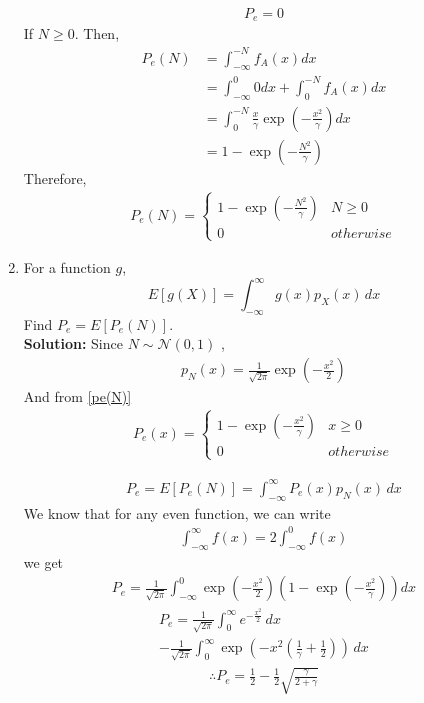 \documentclass[journal,10pt,twocolumn]{IEEEtran}
\newcounter{Chapcounter}
\numberwithin{equation}{subsection}
\numberwithin{figure}{subsection}
\renewcommand\thesection{\theChapcounter.\arabic{section}}
\providecommand{\sbrak}[1]{\ensuremath{{}\left[#1\right]}}
\providecommand{\brak}[1]{\ensuremath{\left(#1\right)}}
\newcommand{\solution}{\noindent \textbf{Solution: }}
\providecommand{\gauss}[2]{\mathcal{N}\ensuremath{\left(#1,#2\right)}}
\renewcommand\thesection{\arabic{section}}
\renewcommand\thesubsection{\thesection.\arabic{subsection}}
\begin{document}
\begin{enumerate}[label=\thesubsection.\arabic*,ref=\thesubsection.\arabic{figure}]
\begin{align}
 P_e=0  
\end{align}
If $N \geq 0$. Then,
\begin{align}
 P_e(N) &=\int_{-\infty}^{-N} f_A(x)dx\\
 &=\int_{-\infty}^{0} 0dx+\int_{0}^{-N} f_A(x)dx\\
 &=\int_{0}^{-N} \frac{x}{\gamma}\exp\brak{{-\frac{x^2}{\gamma}}}dx\\
 &=1-\exp{\brak{-\frac{N^2}{\gamma}}}
\end{align}
Therefore,
\begin{align}\label{pe(N)}
P_e(N) = 
\begin{cases}
1-\exp\brak{{-\frac{N^2}{\gamma}}} & N \geq0\\
0 & otherwise
\end{cases}
\end{align}
%
\item
For a function $g$,
\begin{equation}
\label{prob:ch4_g}
E\sbrak{g(X)} = \int_{-\infty}^{\infty}g(x)p_{X}(x)\, dx
\end{equation}
%
Find $P_e = E\sbrak{P_e(N)}$.
\\
\solution
Since $N \sim \gauss{0}{1}$ ,
\begin{align}
  p_N(x)= \frac{1}{\sqrt{2\pi}}\exp \brak{-\frac{x^2}{2} }
\end{align}
And from \eqref{pe(N)} 
\begin{align}
    P_e(x)=
    \begin{cases}
1-\exp\brak{{-\frac{x^2}{\gamma}}} & x\geq0\\
0 & otherwise
\end{cases}
\end{align}

\begin{align}
 P_e=E\sbrak{P_e(N)} = \int_{-\infty}^{\infty}P_e(x)p_{N}(x)\, dx  
\end{align}
We know that for any even function, we can write
\begin{align}
\int_{-\infty}^{\infty}f(x)=2\int_{-\infty}^{0}f(x)   
\end{align}
we get
\begin{align}
  P_e= \frac{1}{\sqrt{2\pi}}\int_{-\infty}^{0}\exp \brak{ -\frac{x^2}{2}} \brak{1-\exp \brak{ -\frac{x^2}{\gamma}} } dx
\end{align}
\begin{multline}
	P_e = \frac{1}{\sqrt{2\pi}}\int_{0}^{\infty} e^{-\frac{x^2}{2}}  \,dx \\ - \frac{1}{\sqrt{2\pi}}\int_{0}^{\infty} \exp\left(-x^2\left(\frac{1}{\gamma}+\frac{1}{2}\right)\right)  \,dx
\end{multline}
\begin{align}
\therefore P_e = \frac{1}{2} - \frac{1}{2}\sqrt{\frac{\gamma}{2+\gamma}}
\end{align}



\end{enumerate}
\end{document}
